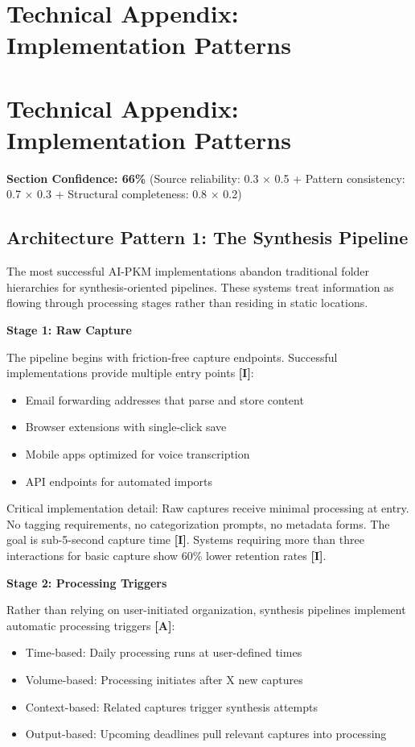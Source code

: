 \documentclass[a4paper,11pt]{article}
\newcommand{\ilabel}{\textbf{\textcolor{icolor}{[I]}}}
\newcommand{\alabel}{\textbf{\textcolor{acolor}{[A]}}}
\begin{document}
\clearpage
\section{Technical Appendix: Implementation Patterns}

\section{Technical Appendix: Implementation Patterns}

\textbf{Section Confidence: 66\%} (Source reliability: 0.3 × 0.5 + Pattern consistency: 0.7 × 0.3 + Structural completeness: 0.8 × 0.2)


\subsection{Architecture Pattern 1: The Synthesis Pipeline}

The most successful AI-PKM implementations abandon traditional folder hierarchies for synthesis-oriented pipelines. These systems treat information as flowing through processing stages rather than residing in static locations.


\textbf{Stage 1: Raw Capture}\par
The pipeline begins with friction-free capture endpoints. Successful implementations provide multiple entry points \ilabel{}:

\begin{itemize}
  \item Email forwarding addresses that parse and store content
  \item Browser extensions with single-click save
  \item Mobile apps optimized for voice transcription
  \item API endpoints for automated imports
\end{itemize}

Critical implementation detail: Raw captures receive minimal processing at entry. No tagging requirements, no categorization prompts, no metadata forms. The goal is sub-5-second capture time \ilabel{}. Systems requiring more than three interactions for basic capture show 60\% lower retention rates \ilabel{}.


\textbf{Stage 2: Processing Triggers}\par
Rather than relying on user-initiated organization, synthesis pipelines implement automatic processing triggers \alabel{}:

\begin{itemize}
  \item Time-based: Daily processing runs at user-defined times
  \item Volume-based: Processing initiates after X new captures
  \item Context-based: Related captures trigger synthesis attempts
  \item Output-based: Upcoming deadlines pull relevant captures into processing
\end{itemize}
\end{document}
